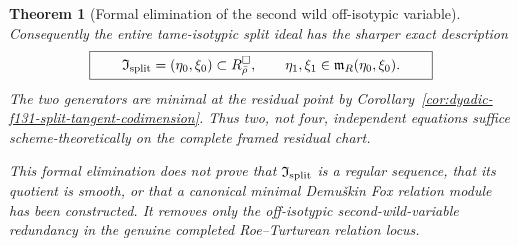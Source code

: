 \documentclass[11pt]{article}
\newtheorem{theorem}{Theorem}[section]
\theoremstyle{definition}
\begin{document}
\begin{theorem}[Formal elimination of the second wild off-isotypic variable]
Consequently the
entire tame-isotypic
split ideal has
the sharper exact
description
\begin{equation}\label{eq:dyadic-f132-two-generator-split-ideal}
\boxed{\qquad
\mathfrak I_{\rm split}
=(\eta_0,\xi_0)
\subset R_{\bar\rho}^{\square},
\qquad
\eta_1,\xi_1\in
\mathfrak m_R
(\eta_0,\xi_0).
\qquad}
\end{equation}
The two generators
are minimal at the
residual point by
Corollary~\ref{cor:dyadic-f131-split-tangent-codimension}.
Thus \emph{two}, not
four, independent
equations suffice
scheme-theoretically
on the complete
framed residual chart.

This formal
elimination does
not prove that
$\mathfrak I_{\rm split}$
is a regular sequence,
that its quotient
is smooth, or that
a canonical minimal
Demu\v{s}kin Fox
relation module has
been constructed.
It removes only the
off-isotypic
second-wild-variable
redundancy in the
genuine completed
Roe--Turturean
relation locus.
\end{theorem}
\end{document}
